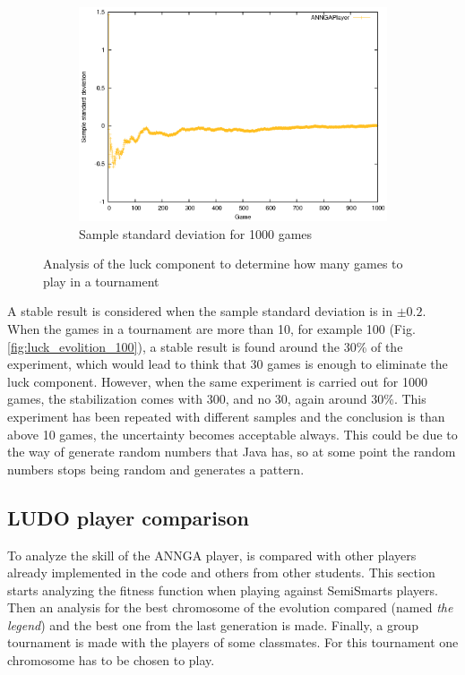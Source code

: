 \begin{figure}[!ht]
\begin{subfigure}{.33\textwidth}
			  \includegraphics[width=\textwidth]{figures/luck_evolution_1000}
			  \caption{Sample standard deviation for 1000 games}
			  \label{fig:luck_evolition_1000}
			\end{subfigure}%
			\caption{Analysis of the luck component to determine how many games to play in a tournament}
			\label{fig:luck_evolution}
		\end{figure}

	A stable result is considered when the sample standard deviation is in $\pm 0.2$.
	When the games in a tournament are more than 10, for example 100 (Fig. \ref{fig:luck_evolition_100}), a stable result is found around the 30\% of the experiment, which would lead to think that 30 games is enough to eliminate the luck component.
	However, when the same experiment is carried out for 1000 games, the stabilization comes with 300, and no 30, again around 30\%.
	This experiment has been repeated with different samples and the conclusion is than above 10 games, the uncertainty becomes acceptable always.
	This could be due to the way of generate random numbers that Java has, so at some point the random numbers stops being random and generates a pattern.

	\subsection{LUDO player comparison} %
	\label{sub:ludo_player_comparison}
	To analyze the skill of the ANNGA player, is compared with other players already implemented in the code and others from other students.
	This section starts analyzing the fitness function when playing against SemiSmarts players. 
	Then an analysis for the best chromosome of the evolution compared (named \emph{the legend}) and the best one from the last generation is made.
	Finally, a group tournament is made with the players of some classmates.
	For this tournament one chromosome has to be chosen to play.
